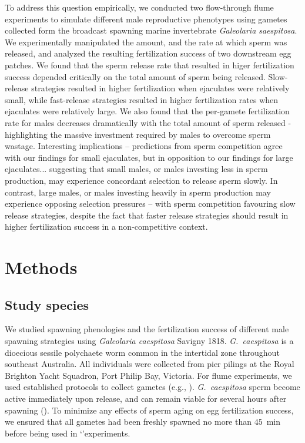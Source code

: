 \documentclass{article}
\begin{document}
To address this question empirically, we conducted two flow-through flume experiments to simulate different male reproductive phenotypes using gametes collected form the broadcast spawning marine invertebrate \textit{Galeolaria saespitosa}. We experimentally manipulated the amount, and the rate at which sperm was released, and analyzed the resulting fertilization success of two downstream egg patches. We found that the sperm release rate that resulted in higer fertilization success depended critically on the total amount of sperm being released. Slow-release strategies resulted in higher fertilization when ejaculates were relatively small, while fast-release strategies resulted in higher fertilization rates when ejaculates were relatively large. We also found that the per-gamete fertilization rate for males decreases dramatically with the total amount of sperm released - highlighting the massive investment required by males to overcome sperm wastage. Interesting implications -- predictions from sperm competition agree with our findings for small ejaculates, but in opposition to our findings for large ejaculates... suggesting that small males, or males investing less in sperm production, may experience concordant selection to release sperm slowly. In contrast, large males, or males investing heavily in sperm production may experience opposing selection pressures -- with sperm competition favouring slow release strategies, despite the fact that faster release strategies should result in higher fertilization success in a non-competitive context.




\section*{Methods}

	\subsection*{Study species}
	We studied spawning phenologies and the fertilization success of different male spawning strategies using \textit{Galeolaria caespitosa} Savigny 1818. \textit{G.~caespitosa} is a dioecious sessile polychaete worm common in the intertidal zone throughout southeast Australia. All individuals were collected from pier pilings at the Royal Brighton Yacht Squadron, Port Philip Bay, Victoria. For flume experiments, we used established protocols to collect gametes (e.g., \citealt{MarshallEvans2005a, MarshallEvans2005b}). \textit{G.~caespitosa} sperm become active immediately upon release, and can remain viable for several hours after spawning (\citealt{Kupriyanova2013}). To minimize any effects of sperm aging on egg fertilization success, we ensured that all gametes had been freshly spawned no more than $45$~min before being used in `'experiments.
\end{document}
